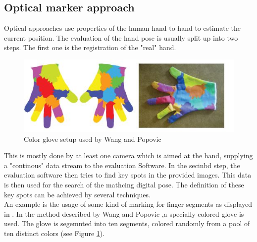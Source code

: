 \subsection{Optical marker approach}
\label{Optical marker approach} 
Optical approaches use properties of the human hand to hand to estimate the current position. The evaluation of the hand pose is usually split up into two steps. The first one is the registration of the "real" hand.\\
\begin{figure}
\includegraphics[scale=0.61]{images/wang_color_glove.JPG}
\caption{Color glove setup used by Wang and Popovic \cite{Wang.2009} }
\label{wang color glove}
\end{figure}
This is mostly done by at least one camera which is aimed at the hand, supplying a "continous" data stream to the evaluation Software. In the secinbd step, the evaluation software then tries to find key spots in the provided images. This data is then used for the search of the mathcing digital pose. The definition of these key spots can be achieved by several techniques.\\
An example is the usage of some kind of marking for finger segments as displayed in \cite{Duca.2007,Fredriksson.2008,Wang.2009}.
In the method described by Wang and Popovic \cite{Wang.2009},a specially colored glove is used. The glove is segemnted into ten segments, colored randomly from a pool of ten distinct colors (see Figure \ref{wang color glove}).

